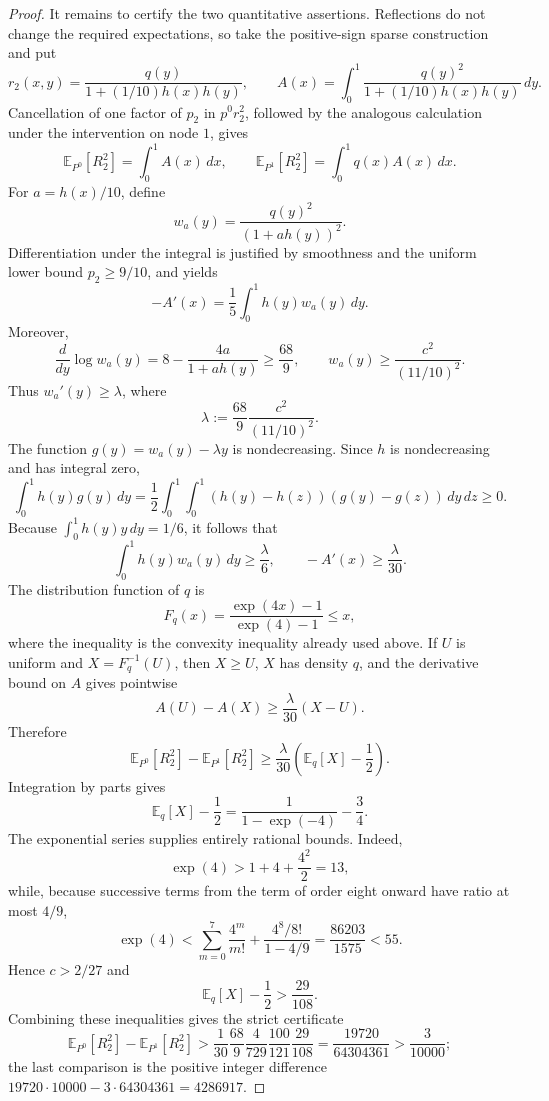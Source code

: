 \documentclass{article}
\begin{document}
\begin{proof}
It remains to certify the two quantitative assertions.  Reflections do not change the required expectations, so take the positive-sign sparse construction and put
\[
 r_2(x,y)=\frac{q(y)}{1+(1/10)h(x)h(y)},
 \qquad
 A(x)=\int_0^1\frac{q(y)^2}{1+(1/10)h(x)h(y)}\,dy.
\]
Cancellation of one factor of \(p_2\) in \(p^0r_2^2\), followed by the analogous calculation under the intervention on node \(1\), gives
\[
 \mathbb E_{P^0}[R_2^2]=\int_0^1A(x)\,dx,
 \qquad
 \mathbb E_{P^1}[R_2^2]=\int_0^1q(x)A(x)\,dx.
\]
For \(a=h(x)/10\), define
\[
 w_a(y)=\frac{q(y)^2}{(1+a h(y))^2}.
\]
Differentiation under the integral is justified by smoothness and the uniform lower bound \(p_2\geq9/10\), and yields
\[
 -A'(x)=\frac15\int_0^1h(y)w_a(y)\,dy.
\]
Moreover,
\[
 \frac{d}{dy}\log w_a(y)=8-\frac{4a}{1+a h(y)}\geq\frac{68}{9},
 \qquad
 w_a(y)\geq\frac{c^2}{(11/10)^2}.
\]
Thus \(w_a'(y)\geq\lambda\), where
\[
 \lambda:=\frac{68}{9}\frac{c^2}{(11/10)^2}.
\]
The function \(g(y)=w_a(y)-\lambda y\) is nondecreasing.  Since \(h\) is nondecreasing and has integral zero,
\[
 \int_0^1h(y)g(y)\,dy
 =\frac12\int_0^1\!\int_0^1
       (h(y)-h(z))(g(y)-g(z))\,dy\,dz\geq0.
\]
Because \(\int_0^1h(y)y\,dy=1/6\), it follows that
\[
 \int_0^1h(y)w_a(y)\,dy\geq\frac{\lambda}{6},
 \qquad
 -A'(x)\geq\frac{\lambda}{30}.
\]
The distribution function of \(q\) is
\[
 F_q(x)=\frac{\exp(4x)-1}{\exp(4)-1}\leq x,
\]
where the inequality is the convexity inequality already used above.  If \(U\) is uniform and \(X=F_q^{-1}(U)\), then \(X\geq U\), \(X\) has density \(q\), and the derivative bound on \(A\) gives pointwise
\[
 A(U)-A(X)\geq\frac{\lambda}{30}(X-U).
\]
Therefore
\[
 \mathbb E_{P^0}[R_2^2]-\mathbb E_{P^1}[R_2^2]
 \geq\frac{\lambda}{30}\left(\mathbb E_q[X]-\frac12\right).
\]
Integration by parts gives
\[
 \mathbb E_q[X]-\frac12
 =\frac{1}{1-\exp(-4)}-\frac34.
\]
The exponential series supplies entirely rational bounds.  Indeed,
\[
 \exp(4)>1+4+\frac{4^2}{2}=13,
\]
while, because successive terms from the term of order eight onward have ratio at most \(4/9\),
\[
 \exp(4)
 <\sum_{m=0}^{7}\frac{4^m}{m!}
   +\frac{4^8/8!}{1-4/9}
 =\frac{86203}{1575}<55.
\]
Hence \(c>2/27\) and
\[
 \mathbb E_q[X]-\frac12>\frac{29}{108}.
\]
Combining these inequalities gives the strict certificate
\[
 \mathbb E_{P^0}[R_2^2]-\mathbb E_{P^1}[R_2^2]
 >\frac1{30}\frac{68}{9}\frac{4}{729}\frac{100}{121}\frac{29}{108}
 =\frac{19720}{64304361}>\frac3{10000};
\]
the last comparison is the positive integer difference
\(19720\cdot10000-3\cdot64304361=4286917\).


\end{proof}
\end{document}
